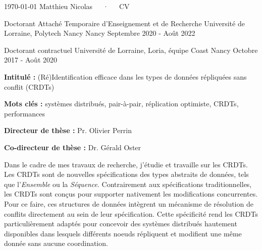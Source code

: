 \documentclass[12pt, a4paper]{awesome-cv}
\begin{document}
\makecvheader[C]

\makecvfooter
  {\today}
  {Matthieu Nicolas~~~·~~~CV}
  {\thepage}


\begin{cventries}

  \cventry
  {Doctorant Attaché Temporaire d'Enseignement et de Recherche}
  {Université de Lorraine, Polytech Nancy}
  {Nancy}
  {Septembre 2020 - Août 2022}
  {}

\cventry
  {Doctorant contractuel}
  {Université de Lorraine, Loria, équipe Coast}
  {Nancy}
  {Octobre 2017 - Août 2020}
  {
    \begin{cvitems} %
      \item {\textbf{Intitulé :} (Ré)Identification efficace dans les types de données répliquées sans conflit (CRDTs)}
      \item{\textbf{Mots clés :} systèmes distribués, pair-à-pair, réplication optimiste, CRDTs, performances}
      \item{\textbf{Directeur de thèse :} Pr. Olivier Perrin}
      \item{\textbf{Co-directeur de thèse :} Dr. Gérald Oster}
    \end{cvitems}
  }

\begin{cvparagraph}
  Dans le cadre de mes travaux de recherche, j'étudie et travaille sur les \acfp{CRDT}.
  Les \acp{CRDT} sont de nouvelles spécifications des types abstraits de données, tels que l'\emph{Ensemble} ou la \emph{Séquence}.
  Contrairement aux spécifications traditionnelles, les \acp{CRDT} sont conçus pour supporter nativement les modifications concurrentes.
  Pour ce faire, ces structures de données intègrent un mécanisme de résolution de conflits directement au sein de leur spécification.
  Cette spécificité rend les \acp{CRDT} particulièrement adaptés pour concevoir des systèmes distribués hautement disponibles dans lesquels différents noeuds répliquent et modifient une même donnée sans aucune coordination.


\end{cvparagraph}
\end{cventries}
\end{document}
